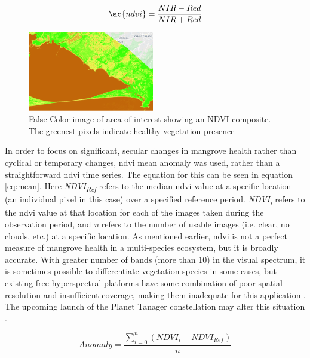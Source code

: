 \begin{equation}
\label{eq:ndvi}
\ac{ndvi} = \frac{NIR - Red}{NIR + Red}
\end{equation}

\begin{figure}[H] 
\centering
\includegraphics[width=0.49\textwidth]{Figures/chap4/guaratiba_ndvi.png}
\caption[False-Color image of area of interest showing an NDVI composite]{False-Color image of area of interest showing an NDVI composite. The greenest pixels indicate healthy vegetation presence}
\label{fig:gndvi}
\end{figure}

In order to focus on significant, secular changes in mangrove health rather than cyclical or temporary changes, \ac{ndvi} mean anomaly was used, rather than a straightforward \ac{ndvi} time series. The equation for this can be seen in equation \ref{eq:mean}. Here \textit{NDVI\textsubscript{Ref}} refers to the median \ac{ndvi} value at a specific location (an individual pixel in this case) over a specified reference period. \textit{NDVI\textsubscript{i}} refers to the \ac{ndvi} value at that location for each of the images taken during the observation period, and \textit{n} refers to the number of usable images (i.e. clear, no clouds, etc.) at a specific location. As mentioned earlier, \ac{ndvi} is not a perfect measure of mangrove health in a multi-species ecosystem, but it is broadly accurate. With greater number of bands (more than 10) in the visual spectrum, it is sometimes possible to differentiate vegetation species in some cases, but existing free hyperspectral platforms have some combination of poor spatial resolution and insufficient coverage, making them inadequate for this application \cite{mousivandGlobalSensitivityAnalysis2014}. The upcoming launch of the Planet Tanager constellation may alter this situation \cite{planetlabspbcPlanetAnnouncesNew2022}.

\begin{equation}
\label{eq:mean}
Anomaly = \frac{\sum_{i=0}^{n} (NDVI_i - NDVI_{Ref})}{n}
\end{equation}

